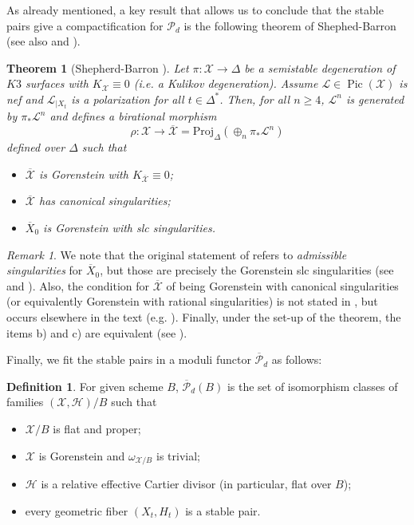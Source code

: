 \documentclass{amsart}
\numberwithin{equation}{section}
\theoremstyle{plain}
\newtheorem{theorem}[equation]{Theorem}
\theoremstyle{remark}
\newtheorem{remark}[equation]{Remark}
\theoremstyle{definition}
\newtheorem{definition}[equation]{Definition}
\def\Pic{\operatorname{Pic}}
\newcommand{\calH}{\mathcal{H}}
\newcommand{\calL}{\mathcal{L}}
\newcommand{\calP}{\mathcal{P}}
\newcommand{\sX}{\mathscr{X}}
\newcommand{\Proj}{\mathrm{Proj}}
\begin{document}
As already mentioned, a key result that allows us to conclude that the stable pairs give a compactification for $\calP_d$ is the following theorem of Shephed-Barron \cite{sbpolarization} (see also \cite{ksb} and \cite{kawamata}). 
\begin{theorem}[{Shepherd-Barron \cite[Thm. 2]{sbpolarization}}]\label{thmsb}
Let $\pi:\sX\to \Delta$ be a semistable degeneration of $K3$ surfaces with $K_{\sX}\equiv 0$ (i.e. a Kulikov degeneration). Assume $\calL\in\Pic(\sX)$ is nef and $\calL_{\mid X_t}$ is a polarization for all $t\in \Delta^*$. Then, for all $n\ge 4$, $\calL^{n}$ is generated by $\pi_*\calL^n$ and defines a birational morphism
$$\rho:\sX\to\overline{\sX}=\Proj_\Delta \left( \oplus_n\pi_*\calL^n\right)$$
defined over $\Delta$ such that 
\begin{itemize}
\item[a)] $\overline{\sX}$ is Gorenstein with $K_{\overline{\sX}}\equiv 0$;
\item[b)] $\overline{\sX}$ has canonical singularities;
\item[c)] $\overline{X}_0$ is Gorenstein with slc singularities. 
\end{itemize}
\end{theorem}

\begin{remark} We note that the original statement of \cite[Thm. 2 (i)]{sbpolarization} refers to {\it admissible singularities} for $\overline{X}_0$, but those are  precisely the Gorenstein slc singularities (see \cite[Def. on p. 34]{sbnef} and \cite[Thm. 4.21]{ksb}). Also, the condition for $\overline{\sX}$  of being Gorenstein with canonical singularities (or equivalently Gorenstein with rational singularities) is not stated in \cite[Thm. 2 (i)]{sbpolarization}, but occurs elsewhere in the text (e.g.  \cite[Thm. 2W]{sbpolarization}). Finally, under the set-up of the theorem, the items b) and c) are equivalent (see \cite[Thm. 5.1]{ksb}).
\end{remark}



Finally, we fit the stable pairs in a moduli functor $\overline{\calP}_d$ as follows:
\begin{definition}\label{defstable2}
For given scheme $B$, $\overline{\calP}_d(B)$ is the set of isomorphism classes of families $(\sX,\calH)/B$ such that
\begin{itemize}
\item[i)] $\sX/B$ is flat and proper;  
\item[ii)] $\sX$ is Gorenstein and $\omega_{\sX/B}$ is trivial;
\item[ii)]  $\calH$ is a relative effective Cartier divisor (in particular, flat over $B$);
\item[iii)] every geometric fiber $(X_t,H_t)$ is a stable pair.
\end{itemize}
\end{definition}
\end{document}

